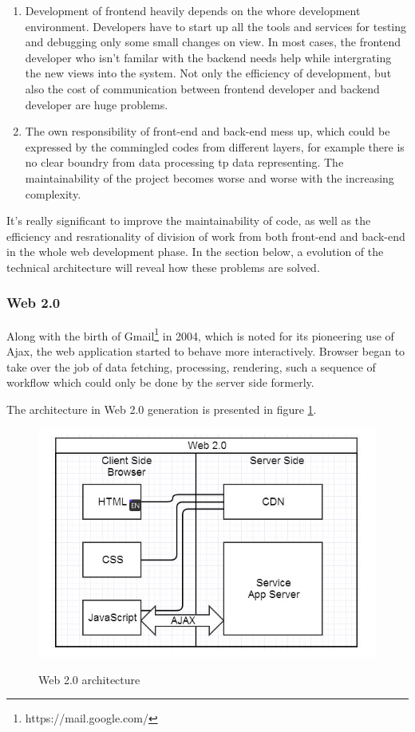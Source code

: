 \begin{enumerate}
\item
Development of frontend heavily depends on the whore development environment. Developers have to start up all the tools and services for testing and debugging only some small changes on view. In most cases, the frontend developer who isn't familar with the backend needs help while intergrating the new views into the system. Not only the efficiency of development, but also the cost of communication between frontend developer and backend developer are huge problems.
\item
The own responsibility of front-end and back-end mess up, which could be expressed by the commingled codes from different layers, for example there is no clear boundry from data processing tp data representing. The maintainability of the project becomes worse and worse with the increasing complexity.
\end{enumerate}

It's really significant to improve the maintainability of code, as well as the efficiency and resrationality of division of work from both front-end and back-end in the whole web development phase. In the section below, a evolution of the technical architecture will reveal how these problems are solved.

\subsubsection{Web 2.0}
Along with the birth of Gmail\footnote{https://mail.google.com/} in 2004, which is noted for its pioneering use of \gls{Ajax}, the web application started to behave more interactively. Browser began to take over the job of data fetching, processing, rendering, such a sequence of workflow which could only be done by the server side formerly.

The architecture in Web 2.0 generation is presented in figure \ref{fig:3.2}.

\begin{figure}[!htbp]
  \caption{Web 2.0 architecture}
  \centering
    \includegraphics[width=1\textwidth]{Figures/3_2.png}
  \label{fig:3.2}
\end{figure}

